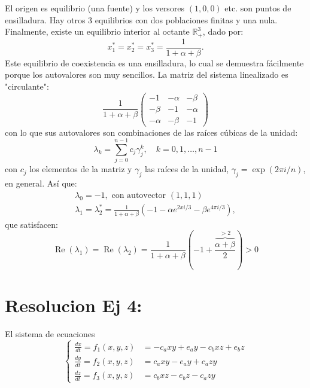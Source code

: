 \documentclass[twocolumn,aps,prl]{revtex4-1}
\begin{document}
El origen es equilibrio (una fuente) y los versores $(1,0,0)$ etc. son puntos de ensilladura. Hay otros 3 equilibrios con dos poblaciones finitas y una nula. Finalmente, existe un equilibrio interior al octante $\mathbb{R}_{+}^{3}$, dado por:
$$
x_{1}^{*}=x_{2}^{*}=x_{3}^{*}=\frac{1}{1+\alpha+\beta} .
$$
Este equilibrio de coexistencia es una ensilladura, lo cual se demuestra fácilmente porque los autovalores son muy sencillos. La matriz del sistema linealizado es "circulante":
$$
\frac{1}{1+\alpha+\beta}\left(\begin{array}{ccc}
-1 & -\alpha & -\beta \\
-\beta & -1 & -\alpha \\
-\alpha & -\beta & -1
\end{array}\right)
$$
con lo que sus autovalores son combinaciones de las raíces cúbicas de la unidad:
$$
\lambda_{k}=\sum_{j=0}^{n-1} c_{j} \gamma_{j}^{k}, \quad k=0,1, \ldots, n-1
$$
con $c_{j}$ los elementos de la matriz y $\gamma_{j}$ las raíces de la unidad, $\gamma_{j}=\exp (2 \pi i / n)$, en general. Así que:
$$
\begin{array}{c}
\lambda_{0}=-1, \text { con autovector }(1,1,1) \\
\lambda_{1}=\lambda_{2}^{*}=\frac{1}{1+\alpha+\beta}\left(-1-\alpha e^{2 x i / 3}-\beta e^{4 \pi i / 3}\right),
\end{array}
$$
que satisfacen:
$$
\operatorname{Re}\left(\lambda_{1}\right)=\operatorname{Re}\left(\lambda_{2}\right)=\frac{1}{1+\alpha+\beta}\left(-1+\frac{\overbrace{\alpha+\beta}^{>2}}{2}\right)>0
$$

% 
%                             
% 

\section{Resolucion Ej 4:}

El sistema de ecuaciones
$$
\left\{
\begin{aligned}
\frac{d x}{d t} = f_1(x, y, z) &=-c_{a} x y+e_{a} y-c_{b} x z+e_{b} z \\
\frac{d y}{d t} = f_2(x, y, z) &=c_{a} x y-e_{a} y+c_{a} z y          \\
\frac{d z}{d t} = f_3(x, y, z) &=c_{b} x z-e_{b} z-c_{a} z y            
\end{aligned}
\right.
$$
\end{document}
